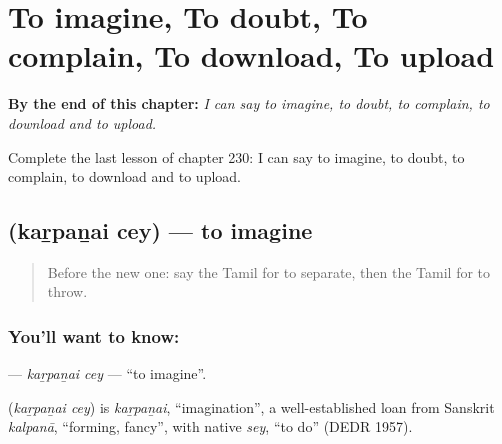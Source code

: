 
\chapter{To imagine, To doubt, To complain, To download, To upload}
\label{ch:ta-to-imagine-to-doubt-to-complain-to-download-to-upload}

\begin{chapteropening}
\textbf{By the end of this chapter:} \emph{I can say to imagine, to doubt, to complain, to download and to upload.}

Complete the last lesson of chapter 230: I can say to imagine, to doubt, to complain, to download and to upload.
\end{chapteropening}

\section[\texorpdfstring{\ta{கற்பனை} \ta{செய்} (kaṟpaṉai cey)}{கற்பனை செய் (kaṟpaṉai cey)}]{  (kaṟpaṉai cey) — to imagine}

\label{lesson:TA-C230-karpanai-cey}



\begin{quote}
Before the new one: say the Tamil for to separate, then the Tamil for to throw.
\end{quote}

\subsection*{You'll want to know:  }
\textbf{ } — \emph{kaṟpaṉai cey} — \textquotedblleft{}to imagine\textquotedblright{}.

\begin{cousinweb}
\textbf{ } (\emph{kaṟpaṉai cey}) is \emph{kaṟpaṉai}, \textquotedblleft{}imagination\textquotedblright{}, a well-established loan from Sanskrit \emph{kalpanā}, \textquotedblleft{}forming, fancy\textquotedblright{}, with native \emph{sey}, \textquotedblleft{}to do\textquotedblright{} (DEDR 1957).
\end{cousinweb}

